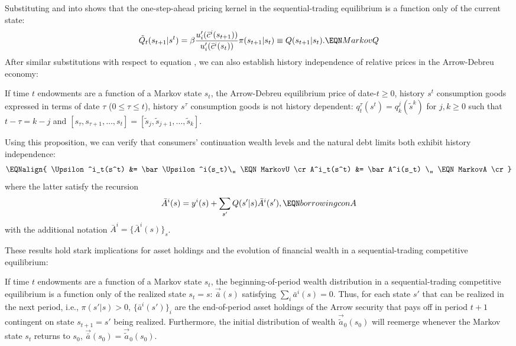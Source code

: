 Substituting  and  into
 shows that the one-step-ahead pricing kernel in the sequential-trading
equilibrium is   a function only of the current state:
$$
\tilde Q_t(s_{t+1} | s^t) = \beta
{ u'_i(\bar c^i(s_{t+1})) \over u'_i(\bar c^i(s_t)) }
\pi(s_{t+1} | s_t) \equiv Q(s_{t+1} | s_t).   \EQN MarkovQ
$$
After similar substitutions with respect to equation ,
we can also
establish history independence of  relative prices in the
Arrow-Debreu economy:




\medskip
{}  If time $t$  endowments are a function of a Markov
state $s_t$, the Arrow-Debreu equilibrium price of date-$t\geq 0$,
history $s^t$
consumption goods expressed in terms of date $\tau$ ($0\leq \tau \leq t$),
history $s^\tau$
consumption goods is not history dependent:
$q^\tau_t(s^t) = q^{j}_{k}(\tilde s^{k})$ for $j, k \geq 0$
such that $t-\tau=k-j$ and
$[s_\tau, s_{\tau+1}, \ldots , s_t] =
 [\tilde s_{j}, \tilde s_{j+1}, \ldots , \tilde s_{k}]$.
\medskip

\noindent
Using this proposition, we can verify that consumers' 
continuation wealth levels  and
the natural debt limits  both
exhibit history independence:
$$\EQNalign{
 \Upsilon^i_t(s^t) &= \bar \Upsilon^i(s_t)\,, \EQN MarkovU 
\cr
 A^i_t(s^t) &= \bar A^i(s_t) \,,              \EQN MarkovA 
\cr}
$$
where the latter satisfy the recursion
$$ \bar A^i(s) = y^i(s) + \sum_{s'} Q(s'|s) \bar A^i(s'),  \EQN borrowingconA $$
with the additional notation 
$\bar A^i = \{\bar A^i(s)\}_s$.


These results hold stark implications for asset holdings
and the evolution of financial wealth in a 
sequential-trading competitive equilibrium:

\medskip
{} If time $t$ endowments are 
a function of a Markov state $s_t$, 
the beginning-of-period wealth distribution in a
sequential-trading competitive equilibrium is
a function only of the realized state $s_t=s$:
$\vec {\bar a}(s)$ satisfying $\sum_i \bar a^i(s)=0$.
Thus, for each state $s'$ that can be realized in the next 
period, i.e., $\pi(s'|s)>0$, $\{\bar a^i(s')\}_i$ are the 
end-of-period asset holdings of the Arrow security that 
pays off in period $t+1$ contingent on state $s_{t+1}=s'$
being realized. Furthermore, the initial distribution of 
wealth $\vec {\tilde a}_0(s_0)$ will reemerge whenever 
the Markov state $s_t$ returns to $s_0$, 
$\vec {\bar a}(s_0) = \vec {\tilde a}_0(s_0)$.
\medskip


